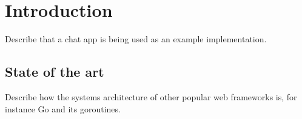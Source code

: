\section{Introduction}
Describe that a chat app is being used as an example implementation.
\subsection{State of the art}
Describe how the systems architecture of other popular web frameworks is, for instance Go and its goroutines.
